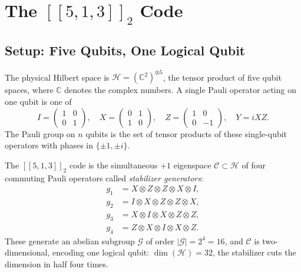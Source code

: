 \documentclass[11pt,a4paper]{article}
\theoremstyle{definition}
\newcommand{\Cnumber}{\mathbb{C}}
\begin{document}
\section{The \texorpdfstring{$[\![5,1,3]\!]_2$}{[[5,1,3]]} Code}
\label{sec:513}

\subsection{Setup: Five Qubits, One Logical Qubit}
\label{sec:513_setup}

The physical Hilbert space is $\mathcal{H} = (\Cnumber^2)^{\otimes 5}$, the tensor product of five qubit spaces, where $\Cnumber$ denotes the complex numbers. A single Pauli operator acting on one qubit is one of
\[
  I = \begin{pmatrix}1&0\\0&1\end{pmatrix},\quad
  X = \begin{pmatrix}0&1\\1&0\end{pmatrix},\quad
  Z = \begin{pmatrix}1&0\\0&-1\end{pmatrix},\quad
  Y = iXZ.
\]
The Pauli group on $n$ qubits is the set of tensor products of these single-qubit operators with phases in $\{\pm 1,\pm i\}$.

The $[\![5,1,3]\!]_2$ code is the simultaneous $+1$ eigenspace $\mathcal{C}\subset\mathcal{H}$ of four commuting Pauli operators called \emph{stabilizer generators}:
\begin{equation}
\begin{aligned}
  g_1 &= X \otimes Z \otimes Z \otimes X \otimes I, \\
  g_2 &= I \otimes X \otimes Z \otimes Z \otimes X, \\
  g_3 &= X \otimes I \otimes X \otimes Z \otimes Z, \\
  g_4 &= Z \otimes X \otimes I \otimes X \otimes Z.
\end{aligned}
\label{eq:gens}
\end{equation}
These generate an abelian subgroup $\mathcal{G}$ of order $|\mathcal{G}| = 2^4 = 16$, and $\mathcal{C}$ is two-dimensional, encoding one logical qubit: $\dim(\mathcal{H}) = 32$, the stabilizer cuts the dimension in half four times.
\end{document}
